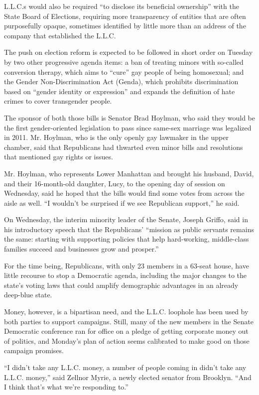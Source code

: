 L.L.C.s would also be required ``to disclose its beneficial ownership''
with the State Board of Elections, requiring more transparency of
entities that are often purposefully opaque, sometimes identified by
little more than an address of the company that established the L.L.C.

The push on election reform is expected to be followed in short order on
Tuesday by two other progressive agenda items: a ban of treating minors
with so-called conversion therapy, which aims to ``cure'' gay people of
being homosexual; and the Gender Non-Discrimination Act (Genda), which
prohibits discrimination based on ``gender identity or expression'' and
expands the definition of hate crimes to cover transgender people.

The sponsor of both those bills is Senator Brad Hoylman, who said they
would be the first gender-oriented legislation to pass since same-sex
marriage was legalized in 2011. Mr. Hoylman, who is the only openly gay
lawmaker in the upper chamber, said that Republicans had thwarted even
minor bills and resolutions that mentioned gay rights or issues.

Mr. Hoylman, who represents Lower Manhattan and brought his husband,
David, and their 16-month-old daughter, Lucy, to the opening day of
session on Wednesday, said he hoped that the bills would find some votes
from across the aisle as well. ``I wouldn't be surprised if we see
Republican support,'' he said.

On Wednesday, the interim minority leader of the Senate, Joseph Griffo,
said in his introductory speech that the Republicans' ``mission as
public servants remains the same: starting with supporting policies that
help hard-working, middle-class families succeed and businesses grow and
prosper.''

For the time being, Republicans, with only 23 members in a 63-seat
house, have little recourse to stop a Democratic agenda, including the
major changes to the state's voting laws that could amplify demographic
advantages in an already deep-blue state.

Money, however, is a bipartisan need, and the L.L.C. loophole has been
used by both parties to support campaigns. Still, many of the new
members in the Senate Democratic conference ran for office on a pledge
of getting corporate money out of politics, and Monday's plan of action
seems calibrated to make good on those campaign promises.

``I didn't take any L.L.C. money, a number of people coming in didn't
take any L.L.C. money,'' said Zellnor Myrie, a newly elected senator
from Brooklyn. ``And I think that's what we're responding to.''

